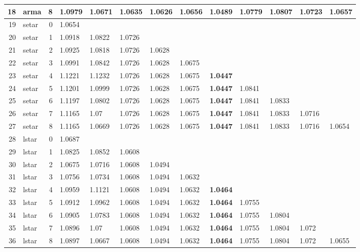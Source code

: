 \documentclass[10pt,a4paper]{article}
\begin{document}
\begin{table}[ht]
\begin{tabular}{rlrllllllllll}
  18 & arma &     8 & 1.0979 & 1.0671 & 1.0635 & 1.0626 & 1.0656 & \textbf{1.0489} & 1.0779 & 1.0807 & 1.0723 & 1.0657 \\ 
   \hline
19 & setar &     0 & 1.0654 &  &  &  &  &  &  &  &  &  \\ 
  20 & setar &     1 & 1.0918 & 1.0822 & 1.0726 &  &  &  &  &  &  &  \\ 
  21 & setar &     2 & 1.0925 & 1.0818 & 1.0726 & 1.0628 &  &  &  &  &  &  \\ 
  22 & setar &     3 & 1.0991 & 1.0842 & 1.0726 & 1.0628 & 1.0675 &  &  &  &  &  \\ 
  23 & setar &     4 & 1.1221 & 1.1232 & 1.0726 & 1.0628 & 1.0675 & \textbf{1.0447} &  &  &  &  \\ 
  24 & setar &     5 & 1.1201 & 1.0999 & 1.0726 & 1.0628 & 1.0675 & \textbf{1.0447} & 1.0841 &  &  &  \\ 
  25 & setar &     6 & 1.1197 & 1.0802 & 1.0726 & 1.0628 & 1.0675 & \textbf{1.0447} & 1.0841 & 1.0833 &  &  \\ 
  26 & setar &     7 & 1.1165 & 1.07 & 1.0726 & 1.0628 & 1.0675 & \textbf{1.0447} & 1.0841 & 1.0833 & 1.0716 &  \\ 
  27 & setar &     8 & 1.1165 & 1.0669 & 1.0726 & 1.0628 & 1.0675 & \textbf{1.0447} & 1.0841 & 1.0833 & 1.0716 & 1.0654 \\ 
   \hline
28 & lstar &     0 & 1.0687 &  &  &  &  &  &  &  &  &  \\ 
  29 & lstar &     1 & 1.0825 & 1.0852 & 1.0608 &  &  &  &  &  &  &  \\ 
  30 & lstar &     2 & 1.0675 & 1.0716 & 1.0608 & 1.0494 &  &  &  &  &  &  \\ 
  31 & lstar &     3 & 1.0756 & 1.0734 & 1.0608 & 1.0494 & 1.0632 &  &  &  &  &  \\ 
  32 & lstar &     4 & 1.0959 & 1.1121 & 1.0608 & 1.0494 & 1.0632 & \textbf{1.0464} &  &  &  &  \\ 
  33 & lstar &     5 & 1.0912 & 1.0962 & 1.0608 & 1.0494 & 1.0632 & \textbf{1.0464} & 1.0755 &  &  &  \\ 
  34 & lstar &     6 & 1.0905 & 1.0783 & 1.0608 & 1.0494 & 1.0632 & \textbf{1.0464} & 1.0755 & 1.0804 &  &  \\ 
  35 & lstar &     7 & 1.0896 & 1.07 & 1.0608 & 1.0494 & 1.0632 & \textbf{1.0464} & 1.0755 & 1.0804 & 1.072 &  \\ 
  36 & lstar &     8 & 1.0897 & 1.0667 & 1.0608 & 1.0494 & 1.0632 & \textbf{1.0464} & 1.0755 & 1.0804 & 1.072 & 1.0655 \\ 

\end{tabular}
\end{table}
\end{document}
